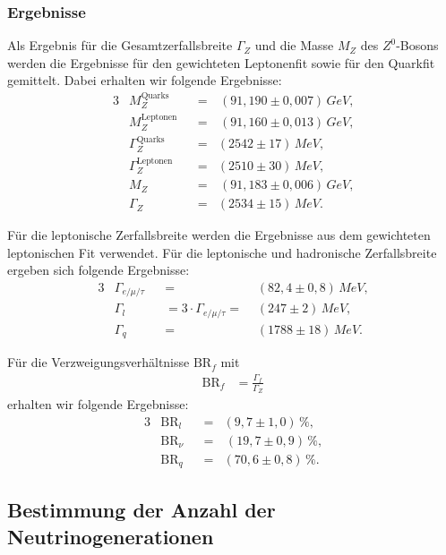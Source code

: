 \subsubsection{Ergebnisse}

Als Ergebnis für die Gesamtzerfallsbreite $\Gamma_Z$ und die Masse $M_Z$ des $Z^0$-Bosons werden die Ergebnisse für den gewichteten Leptonenfit sowie für den Quarkfit gemittelt. Dabei erhalten wir folgende Ergebnisse:
\begin{alignat}{3}
	&M_Z^\text{Quarks}&&=&\,(91,190\pm0,007)\,\si{GeV}\text{,}\\
	&M_Z^\text{Leptonen}&&=&\,(91,160\pm0,013)\,\si{GeV}\text{,}\\
	&\Gamma_Z^\text{Quarks}&&=&(2542\pm17)\,\si{MeV}\text{,}\\
	&\Gamma_Z^\text{Leptonen}&&=&(2510\pm30)\,\si{MeV}\text{,}\\
	&M_Z&&=&\,(91,183\pm0,006)\,\si{GeV}\text{,}\\
	&\Gamma_Z&&=&(2534\pm15)\,\si{MeV}\text{.}
\end{alignat}

Für die leptonische Zerfallsbreite werden die Ergebnisse aus dem gewichteten leptonischen Fit verwendet. Für die leptonische und hadronische Zerfallsbreite ergeben sich folgende Ergebnisse:
\begin{alignat}{3}
	&\Gamma_{e/\mu/\tau}&&=&(82,4\pm0,8)\,\si{MeV}\text{,}\\
	&\Gamma_l&&=3\cdot\Gamma_{e/\mu/\tau}=\,\,&(247\pm2)\,\si{MeV}\text{,}\\
	&\Gamma_q&&=&(1788\pm18)\,\si{MeV}\text{.}
\end{alignat}

Für die Verzweigungsverhältnisse $\mathrm{BR}_f$ mit
\begin{align}
	\mathrm{BR}_f&=\frac{\Gamma_f}{\Gamma_Z}
\end{align}
erhalten wir folgende Ergebnisse:
\begin{alignat}{3}
	&\mathrm{BR}_l&&=&(9,7\pm1,0)\,\%\text{,}\\
	&\mathrm{BR}_\nu&&=&\,(19,7\pm0,9)\,\%\text{,}\\
	&\mathrm{BR}_q&&=&(70,6\pm0,8)\,\%\text{.}
\end{alignat}

\subsection{Bestimmung der Anzahl der Neutrinogenerationen}

